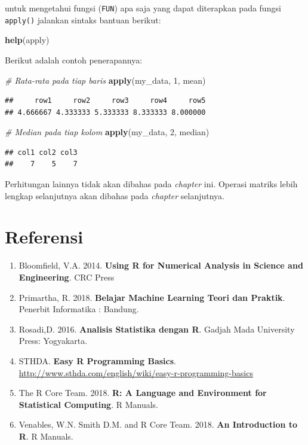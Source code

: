 \documentclass[]{book}
\newenvironment{Shaded}{\begin{snugshade}}{\end{snugshade}}
\newcommand{\CommentTok}[1]{\textcolor[rgb]{0.56,0.35,0.01}{\textit{#1}}}
\newcommand{\DecValTok}[1]{\textcolor[rgb]{0.00,0.00,0.81}{#1}}
\newcommand{\KeywordTok}[1]{\textcolor[rgb]{0.13,0.29,0.53}{\textbf{#1}}}
\newcommand{\NormalTok}[1]{#1}
\providecommand{\tightlist}{%
  \setlength{\itemsep}{0pt}\setlength{\parskip}{0pt}}
\theoremstyle{definition}
\theoremstyle{definition}
\theoremstyle{definition}
\theoremstyle{remark}
\begin{document}
untuk mengetahui fungsi (\texttt{FUN}) apa saja yang dapat diterapkan pada fungsi \texttt{apply()} jalankan sintaks bantuan berikut:

\begin{Shaded}
\begin{Highlighting}[]
\KeywordTok{help}\NormalTok{(apply)}
\end{Highlighting}
\end{Shaded}

Berikut adalah contoh penerapannya:

\begin{Shaded}
\begin{Highlighting}[]
\CommentTok{# Rata-rata pada tiap baris}
\KeywordTok{apply}\NormalTok{(my_data, }\DecValTok{1}\NormalTok{, mean)}
\end{Highlighting}
\end{Shaded}

\begin{verbatim}
##     row1     row2     row3     row4     row5 
## 4.666667 4.333333 5.333333 8.333333 8.000000
\end{verbatim}

\begin{Shaded}
\begin{Highlighting}[]
\CommentTok{# Median pada tiap kolom}
\KeywordTok{apply}\NormalTok{(my_data, }\DecValTok{2}\NormalTok{, median)}
\end{Highlighting}
\end{Shaded}

\begin{verbatim}
## col1 col2 col3 
##    7    5    7
\end{verbatim}

Perhitungan lainnya tidak akan dibahas pada \emph{chapter} ini. Operasi matriks lebih lengkap selanjutnya akan dibahas pada \emph{chapter} selanjutnya.

\hypertarget{referensi-1}{%
\section{Referensi}\label{referensi-1}}

\begin{enumerate}
\def\labelenumi{\arabic{enumi}.}
\tightlist
\item
  Bloomfield, V.A. 2014. \textbf{Using R for Numerical Analysis in Science and Engineering}. CRC Press
\item
  Primartha, R. 2018. \textbf{Belajar Machine Learning Teori dan Praktik}. Penerbit Informatika : Bandung.
\item
  Rosadi,D. 2016. \textbf{Analisis Statistika dengan R}. Gadjah Mada University Press: Yogyakarta.
\item
  STHDA. \textbf{Easy R Programming Basics}. \url{http://www.sthda.com/english/wiki/easy-r-programming-basics}
\item
  The R Core Team. 2018. \textbf{R: A Language and Environment for Statistical Computing}. R Manuals.
\item
  Venables, W.N. Smith D.M. and R Core Team. 2018. \textbf{An Introduction to R}. R Manuals.
\end{enumerate}
\end{document}
